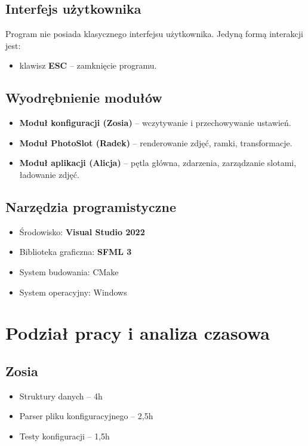 \documentclass[12pt]{article}
\begin{document}
\subsection{Interfejs użytkownika}
Program nie posiada klasycznego interfejsu użytkownika. Jedyną formą interakcji jest:
\begin{itemize}
    \item klawisz \textbf{ESC} – zamknięcie programu.
\end{itemize}

\subsection{Wyodrębnienie modułów}
\begin{itemize}
    \item \textbf{Moduł konfiguracji (Zosia)} – wczytywanie i przechowywanie ustawień.
    \item \textbf{Moduł PhotoSlot (Radek)} – renderowanie zdjęć, ramki, transformacje.
    \item \textbf{Moduł aplikacji (Alicja)} – pętla główna, zdarzenia, zarządzanie slotami, ładowanie zdjęć.
\end{itemize}

\subsection{Narzędzia programistyczne}
\begin{itemize}
    \item Środowisko: \textbf{Visual Studio 2022}
    \item Biblioteka graficzna: \textbf{SFML 3}
    \item System budowania: CMake
    \item System operacyjny: Windows
\end{itemize}

\section{Podział pracy i analiza czasowa}

\subsection*{Zosia}
\begin{itemize}
    \item Struktury danych – 4h
    \item Parser pliku konfiguracyjnego – 2,5h
    \item Testy konfiguracji – 1,5h
\end{itemize}
\end{document}
